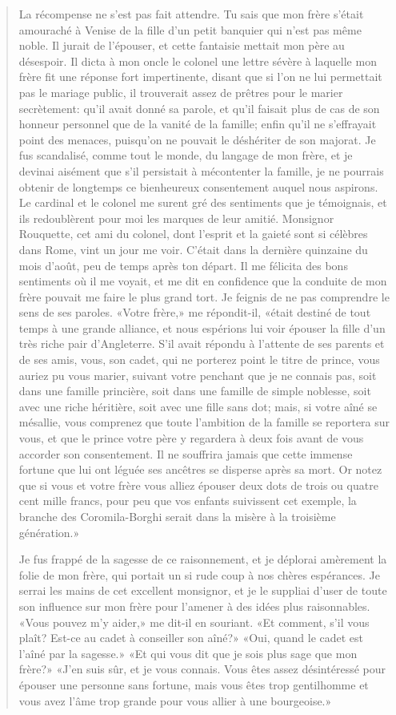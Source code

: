 \begin{quote}
La récompense ne s'est pas fait attendre. Tu sais que mon frère s'était
amouraché à Venise de la fille d'un petit banquier qui n'est pas même
noble. Il jurait de l'épouser, et cette fantaisie mettait mon père au
désespoir. Il dicta à mon oncle le colonel une lettre sévère à laquelle
mon frère fit une réponse fort impertinente, disant que si l'on ne lui
permettait pas le mariage public, il trouverait assez de prêtres pour le
marier secrètement: qu'il avait donné sa parole, et qu'il faisait plus
de cas de son honneur personnel que de la vanité de la famille; enfin
qu'il ne s'effrayait point des menaces, puisqu'on ne pouvait le
déshériter de son majorat. Je fus scandalisé, comme tout le monde, du
langage de mon frère, et je devinai aisément que s'il persistait à
mécontenter la famille, je ne pourrais obtenir de longtemps ce
bienheureux consentement auquel nous aspirons. Le cardinal et le colonel
me surent gré des sentiments que je témoignais, et ils redoublèrent pour
moi les marques de leur amitié. Monsignor Rouquette, cet ami du colonel,
dont l'esprit et la gaieté sont si célèbres dans Rome, vint un jour me
voir. C'était dans la dernière quinzaine du mois d'août, peu de temps
après ton départ. Il me félicita des bons sentiments où il me voyait, et
me dit en confidence que la conduite de mon frère pouvait me faire le
plus grand tort. Je feignis de ne pas comprendre le sens de ses paroles.
«Votre frère,» me répondit-il, «était destiné de tout temps à une grande
alliance, et nous espérions lui voir épouser la fille d'un très riche
pair d'Angleterre. S'il avait répondu à l'attente de ses parents et de
ses amis, vous, son cadet, qui ne porterez point le titre de prince,
vous auriez pu vous marier, suivant votre penchant que je ne connais
pas, soit dans une famille princière, soit dans une famille de simple
noblesse, soit avec une riche héritière, soit avec une fille sans dot;
mais, si votre aîné se mésallie, vous comprenez que toute l'ambition de
la famille se reportera sur vous, et que le prince votre père y
regardera à deux fois avant de vous accorder son consentement. Il ne
souffrira jamais que cette immense fortune que lui ont léguée ses
ancêtres se disperse après sa mort. Or notez que si vous et votre frère
vous alliez épouser deux dots de trois ou quatre cent mille francs, pour
peu que vos enfants suivissent cet exemple, la branche des
Coromila-Borghi serait dans la misère à la troisième génération.»

Je fus frappé de la sagesse de ce raisonnement, et je déplorai amèrement
la folie de mon frère, qui portait un si rude coup à nos chères
espérances. Je serrai les mains de cet excellent monsignor, et je le
suppliai d'user de toute son influence sur mon frère pour l'amener à des
idées plus raisonnables. «Vous pouvez m'y aider,» me dit-il en souriant.
«Et comment, s'il vous plaît? Est-ce au cadet à conseiller son aîné?»
«Oui, quand le cadet est l'aîné par la sagesse.» «Et qui vous dit que je
sois plus sage que mon frère?» «J'en suis sûr, et je vous connais. Vous
êtes assez désintéressé pour épouser une personne sans fortune, mais
vous êtes trop gentilhomme et vous avez l'âme trop grande pour vous
allier à une bourgeoise.»


\end{quote}
